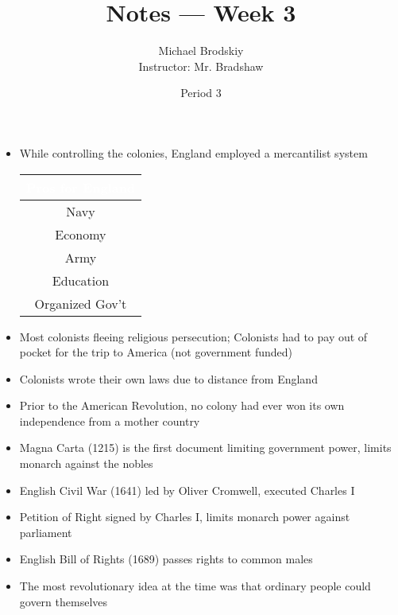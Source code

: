 \documentclass[12pt]{article}
\title{Notes — Week 3}
\date{Period 3}
\author{Michael Brodskiy\\ \small Instructor: Mr. Bradshaw}
\begin{document}
\maketitle

\begin{itemize}

  \item While controlling the colonies, England employed a mercantilist system

    \begin{center}
      \begin{tabular}{| c |}
        \hline
        \rowcolor{BurntOrange} \textcolor{white}{Pros for England}\\
        \hline
        Navy\\
        \rowcolor{Gray!50} Economy\\
        Army\\
        \rowcolor{Gray!50} Education\\
        Organized Gov't\\
        \hline
      \end{tabular}
    \end{center}

  \item Most colonists fleeing religious persecution; Colonists had to pay out of pocket for the trip to America (not government funded)

  \item Colonists wrote their own laws due to distance from England

  \item Prior to the American Revolution, no colony had ever won its own independence from a mother country

  \item Magna Carta (1215) is the first document limiting government power, limits monarch against the nobles

  \item English Civil War (1641) led by Oliver Cromwell, executed Charles I

  \item Petition of Right signed by Charles I, limits monarch power against parliament

  \item English Bill of Rights (1689) passes rights to common males

  \item The most revolutionary idea at the time was that ordinary people could govern themselves


\end{itemize}
\end{document}
